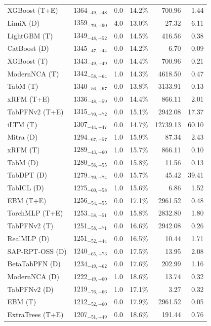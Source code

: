 \begin{tabular}{llccrr}
XGBoost (T+E) & 1364${}_{-49,+48}$ & 0.0 & 14.2\% & 700.96 & 1.44 \\
LimiX (D) & 1359${}_{-70,+90}$ & 4.0 & 13.0\% & 27.32 & 6.11 \\
LightGBM (T) & 1349${}_{-48,+52}$ & 0.0 & 14.5\% & 416.56 & 0.38 \\
CatBoost (D) & 1345${}_{-47,+44}$ & 0.0 & 14.2\% & 6.70 & 0.09 \\
XGBoost (T) & 1343${}_{-49,+49}$ & 0.0 & 14.4\% & 700.96 & 0.21 \\
ModernNCA (T) & 1342${}_{-58,+64}$ & 1.0 & 14.3\% & 4618.50 & 0.47 \\
TabM (T) & 1340${}_{-56,+67}$ & 0.0 & 13.8\% & 3133.91 & 0.13 \\
xRFM (T+E) & 1336${}_{-48,+59}$ & 0.0 & 14.4\% & 866.11 & 2.01 \\
TabPFNv2 (T+E) & 1315${}_{-70,+72}$ & 0.0 & 15.1\% & 2942.08 & 17.37 \\
iLTM (T) & 1307${}_{-44,+47}$ & 0.0 & 14.7\% & 12739.13 & 60.10 \\
Mitra (D) & 1294${}_{-67,+57}$ & 1.0 & 15.9\% & 87.34 & 2.43 \\
xRFM (T) & 1289${}_{-43,+60}$ & 1.0 & 15.7\% & 866.11 & 0.10 \\
TabM (D) & 1280${}_{-56,+55}$ & 0.0 & 15.8\% & 11.56 & 0.13 \\
TabDPT (D) & 1279${}_{-70,+74}$ & 0.0 & 15.7\% & 45.42 & 39.41 \\
TabICL (D) & 1275${}_{-60,+58}$ & 1.0 & 15.6\% & 6.86 & 1.52 \\
EBM (T+E) & 1256${}_{-54,+55}$ & 0.0 & 17.1\% & 2961.52 & 0.48 \\
TorchMLP (T+E) & 1253${}_{-58,+51}$ & 0.0 & 15.8\% & 2832.80 & 1.80 \\
TabPFNv2 (T) & 1251${}_{-58,+71}$ & 0.0 & 16.6\% & 2942.08 & 0.26 \\
RealMLP (D) & 1251${}_{-52,+44}$ & 0.0 & 16.5\% & 10.44 & 1.71 \\
SAP-RPT-OSS (D) & 1240${}_{-65,+73}$ & 0.0 & 17.5\% & 13.95 & 2.08 \\
BetaTabPFN (D) & 1234${}_{-49,+62}$ & 0.0 & 17.6\% & 202.99 & 1.16 \\
ModernNCA (D) & 1222${}_{-49,+60}$ & 1.0 & 18.6\% & 13.74 & 0.32 \\
TabPFNv2 (D) & 1219${}_{-76,+66}$ & 1.0 & 17.1\% & 3.27 & 0.32 \\
EBM (T) & 1212${}_{-52,+60}$ & 0.0 & 17.9\% & 2961.52 & 0.05 \\
ExtraTrees (T+E) & 1207${}_{-51,+49}$ & 0.0 & 18.6\% & 191.44 & 0.76 \\

\end{tabular}
